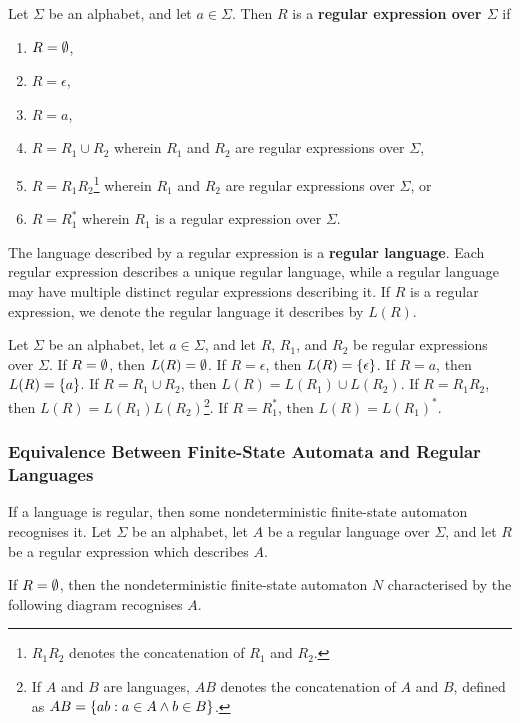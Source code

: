 \Bdf
    Let \(\Sigma\) be an alphabet, and let \(a \in \Sigma\). Then \(R\) is a
    {\bf regular expression over \(\Sigma\)} if
    \begin{enumerate}
        \item \(R = \emptyset\),
        \item \(R = \epsilon\),
        \item \(R = a\),
        \item \(R = R_1 \cup R_2\) wherein \(R_1\) and \(R_2\) are regular
        expressions over \(\Sigma\),
        \item \(R = R_1 R_2\)\footnote{\(R_1 R_2\) denotes the concatenation of
        \(R_1\) and \(R_2\).} wherein \(R_1\) and \(R_2\) are regular
        expressions over \(\Sigma\), or
        \item \(R = R_1^*\) wherein \(R_1\) is a regular expression over
        \(\Sigma\).
    \end{enumerate}
\Edf

The language described by a regular expression is a {\bf regular language}. Each
regular expression describes a unique regular language, while a regular language
may have multiple distinct regular expressions describing it. If \(R\) is a
regular expression, we denote the regular language it describes by \(L(R)\).

Let \(\Sigma\) be an alphabet, let \(a \in \Sigma\), and let \(R\), \(R_1\), and
\(R_2\) be regular expressions over \(\Sigma\). If \(R = \emptyset\), then \(L(R) =
\emptyset\). If \(R = \epsilon\), then \(L(R) = \{\epsilon\}\). If \(R = a\), then
\(L(R) = \{a\}\). If \(R = R_1 \cup R_2\), then \(L(R) = L(R_1) \cup L(R_2)\).
If \(R = R_1 R_2\), then \(L(R) = L(R_1) L(R_2)\)\footnote{If \(A\) and \(B\)
are languages, \(A B\) denotes the concatenation of \(A\) and \(B\), defined
as \(A B = \{a b : a \in A \land b \in B\}\).}. If \(R = R_1^*\), then \(L(R) =
L(R_1)^*\).

\subsubsection{Equivalence Between Finite-State Automata and Regular Languages}

\Blm
    \label{lem1}
    If a language is regular, then some nondeterministic finite-state automaton
    recognises it.
\Elm
\Bpr
    Let \(\Sigma\) be an alphabet, let \(A\) be a regular language over
    \(\Sigma\), and let \(R\) be a regular expression which describes \(A\).

    If \(R = \emptyset\), then the nondeterministic finite-state automaton \(N\)
    characterised by the following diagram recognises \(A\).
    \begin{figure}[!h]
        \centering
    \end{figure}

